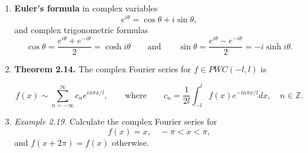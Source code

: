 \begin{enumerate}
\newpage

\item \textbf{Euler's formula} in complex variables
\[e^{i\theta} = \cos \theta + i\sin \theta,\]
and complex trigonometric formulas
\[\cos \theta = \frac{e^{i\theta} + e^{-i\theta} }{2}= \cosh i\theta  \qquad \text{and} \qquad \sin \theta = \frac{e^{i\theta} - e^{-i\theta} }{2}=-i \sinh i\theta.\]



\item \textbf{Theorem 2.14.} The complex Fourier series for $f \in P W C(-l, l)$ is 

\[f(x) \sim \sum _{n=-\infty}^{\infty} c_{n}e^{i n\pi x/ l }, \qquad \text{where} \qquad c_{n}=\frac{1}{2l}\int_{-l}^{l}f(x)e^{-i n \pi x/l}dx, \quad n\in \mathbb{Z}.\]



\item \textit{Example 2.19.} Calculate the complex Fourier series for
\[f(x)=x, \quad -\pi<x<\pi,\]
and $f(x+2\pi)=f(x)$ otherwise.

\newpage

\null



\end{enumerate}




